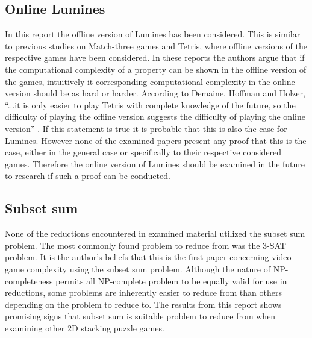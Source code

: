 \subsection{Online Lumines}

In this report the offline version of Lumines has been considered. This is similar to previous studies on Match-three games and Tetris, where offline versions of the respective games have been considered. In these reports the authors argue that if the computational complexity of a property can be shown in the offline version of the games, intuitively it corresponding computational complexity in the online version should be as hard or harder. According to Demaine, Hoffman and Holzer, ``...it is only easier to play Tetris with complete knowledge of the future, so the difficulty of playing the offline version suggests the difficulty of playing the online version'' \cite[p. 2]{tetris}. If this statement is true it is probable that this is also the case for Lumines. However none of the examined papers present any proof that this is the case, either in the general case or specifically to their respective considered games. Therefore the online version of Lumines should be examined in the future to research if such a proof can be conducted.

\subsection{Subset sum}

None of the reductions encountered in examined material utilized the subset sum problem. The most commonly found problem to reduce from was the 3-SAT problem. It is the author's beliefs that this is the first paper concerning video game complexity using the subset sum problem. Although the nature of NP-completeness permits all NP-complete problem to be equally valid for use in reductions, some problems are inherently easier to reduce from than others depending on the problem to reduce to. The results from this report shows promising signs that subset sum is suitable problem to reduce from when examining other 2D stacking puzzle games. 
